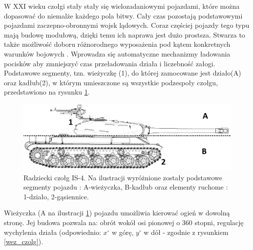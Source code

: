 W XXI wieku czołgi stały stały się wielozadaniowymi pojazdami, które można dopasować do niemalże każdego pola bitwy. Cały czas pozostają podstawowymi pojazdami zaczepno-obronnymi wojsk lądowych. Coraz częściej pojazdy tego typu mają budowę modułową, dzięki temu ich naprawa jest dużo prostsza. Stwarza to także możliwość doboru różnorodnego wyposażenia pod kątem konkretnych warunków bojowych \cite{kierunek_rozwoju}. Wprowadza się automatyczne mechanizmy ładowania pocisków aby zmniejszyć czas przeładowania działa i liczebność załogi. Podstawowe segmenty, tzn. wieżyczkę (1), do której zamocowane jest działo(A) oraz kadłub(2), w którym umieszczone są wszystkie podzespoły czołgu, przedstawiono na rysunku \ref{podzal}. 

  \begin{figure}[H]
    \begin{center}
      \includegraphics[scale=0.5]{imgs/cz_bud.png}
 	\caption[Czołg \textit{IS-4} - podział]{\small{Radziecki czołg IS-4. Na ilustracji wyróżnione zostały podstawowe segmenty pojazdu : A-wieżyczka, B-kadłub oraz elementy ruchome : 1-działo, 2-gąsiennice.}\footnotemark}
	\label{podzal}
    \end{center}
  \end{figure}

Wieżyczka (A na ilustracji \ref{podzal}) pojazdu umożliwia kierować ogień w dowolną stronę. Jej budowa pozwala na: obrót wokół osi pionowej o 360 stopni, regulację wychylenia działa (odpowiednio: $x^\circ$ w górę, $y^\circ$ w dół - zgodnie z rysunkiem \ref{wez_czolg}).

